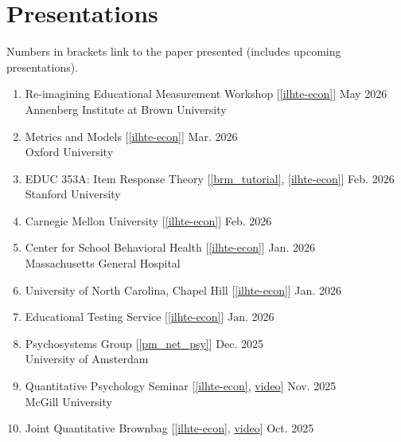 \documentclass[11pt]{article}
\begin{document}
\section{Presentations}

Numbers in brackets link to the paper presented (includes upcoming presentations).

\begin{enumerate}
\subsection{Invited Talks}

    \item Re-imagining Educational Measurement Workshop [\ref{ilhte-econ}] \hfill May 2026 \\
    Annenberg Institute at Brown University
    \item Metrics and Models [\ref{ilhte-econ}] \hfill Mar. 2026 \\
    Oxford University
    \item  EDUC 353A: Item Response Theory [\ref{brm_tutorial}, \ref{ilhte-econ}] \hfill Feb. 2026 \\
    Stanford University
\item Carnegie Mellon University [\ref{ilhte-econ}] \hfill Feb. 2026
\item Center for School Behavioral Health [\ref{ilhte-econ}] \hfill Jan. 2026 \\
Massachusetts General Hospital
\item University of North Carolina, Chapel Hill [\ref{ilhte-econ}] \hfill Jan. 2026
\item Educational Testing Service [\ref{ilhte-econ}] \hfill Jan. 2026
\item Psychosystems Group [\ref{pm_net_psy}] \hfill Dec. 2025 \\ University of Amsterdam
\item Quantitative Psychology Seminar [\ref{ilhte-econ}, \href{https://www.youtube.com/watch?v=Hm2pci-n-Bg}{video}] \hfill Nov. 2025 \\
McGill University
\item Joint Quantitative Brownbag [\ref{ilhte-econ}, \href{https://osu.zoom.us/rec/play/rSn9JffYCT0xgttCwOAYY-OVrRgFIxHlUdaN_jP-YWp_roziomm-mkzlYWx-15qN6EXlMYE1I3cjP7IH.snikx6YCf31QS-cj?eagerLoadZvaPages=sidemenu.billing.plan_management&accessLevel=meeting&canPlayFromShare=true&from=share_recording_detail&continueMode=true&componentName=rec-play&originRequestUrl=https%3A%2F%2Fosu.zoom.us%2Frec%2Fshare%2FtzAbx13OmJfcwAKypG1_8deX1rbruQIeWWkh7lTcdsTjcilj11abF51VDw_illXe.p7AaKkNRM9XNUe1v}{video}] \hfill Oct. 2025 \\

\end{enumerate}
\end{document}
